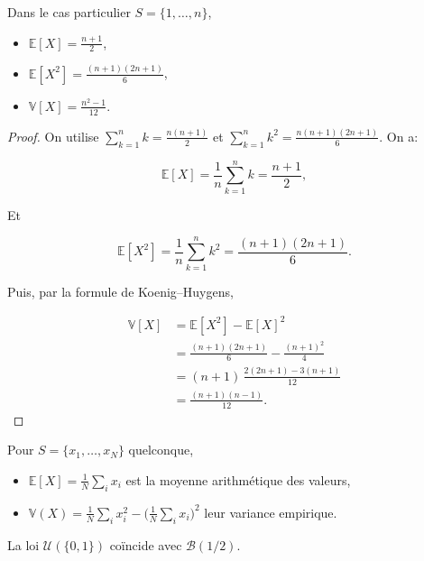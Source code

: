 \medskip

\begin{mdframed}
\begin{proposition}
Dans le cas particulier $S=\{1,\dots,n\}$,

\begin{itemize}
\item $\mathbb{E}[X]=\frac{n+1}{2}$,
\item $\mathbb{E}[X^2]=\frac{(n+1)(2n+1)}{6}$,
\item $\mathbb{V}[X]=\frac{n^2-1}{12}$.
\end{itemize}
\end{proposition}
\end{mdframed}

\begin{proof}
On utilise $\sum_{k=1}^n k=\tfrac{n(n+1)}{2}$ et $\sum_{k=1}^n k^2=\tfrac{n(n+1)(2n+1)}{6}$. On a:

$$
\mathbb{E}[X]=\frac1n\sum_{k=1}^n k=\frac{n+1}{2},
$$

Et

$$
\mathbb{E}[X^2]=\frac1n\sum_{k=1}^n k^2=\frac{(n+1)(2n+1)}{6}.
$$

Puis, par la formule de Koenig--Huygens,

\begin{align*}
\mathbb{V}[X] &=\mathbb{E}[X^2]-\mathbb{E}[X]^2 \\
& =\frac{(n+1)(2n+1)}{6}-\frac{(n+1)^2}{4} \\
& =(n+1)\,\frac{2(2n+1)-3(n+1)}{12} \\
&  =\frac{(n+1)(n-1)}{12}. 
\end{align*}
\end{proof}

\begin{remarque}
Pour $S=\{x_1,\dots,x_N\}$ quelconque, 
\begin{itemize}
\item $\mathbb{E}[X]=\frac{1}{N} \sum_i x_i$ est la moyenne arithmétique des valeurs, 
\item $\mathbb{V}(X)=\frac1N\sum_i x_i^2-\big(\frac1N\sum_i x_i\big)^2$ leur variance empirique.
\end{itemize}
\end{remarque}

\medskip

\begin{mdframed}
\begin{proposition}
La loi $\mathcal{U}(\{0,1\})$ coïncide avec $\mathcal{B}(1/2)$.
\end{proposition}
\end{mdframed}


